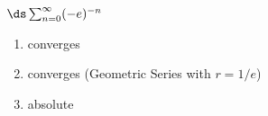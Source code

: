 {$\ds \sum_{n=0}^\infty (-e)^{-n}$
}
{\begin{enumerate}
	\item converges
	\item	converges (Geometric Series with $r=1/e$)
	\item absolute
\end{enumerate}
}